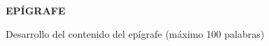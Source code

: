 \thispagestyle{empty} %
\begin{flushright}
	
	\medspace
	\vspace{1.5cm}
	
	\textbf{\large EPÍGRAFE}\\
	
	\vspace{1cm}
	
	Desarrollo del contenido del epígrafe (máximo 100 palabras)
	
\end{flushright}